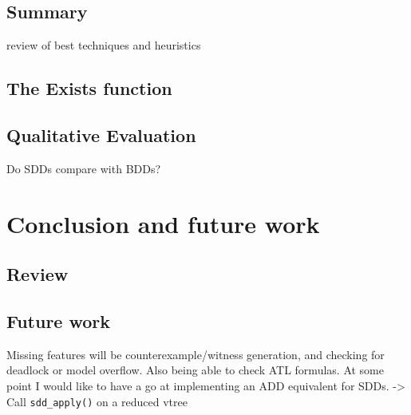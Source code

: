 \documentclass[11pt]{article}
\begin{document}
\subsection{Summary}

review of best techniques and heuristics

\subsection{The Exists function}

\subsection{Qualitative Evaluation}

Do SDDs compare with BDDs?

\section{Conclusion and future work}

\subsection{Review}

\subsection{Future work}

Missing features will be counterexample/witness generation, and checking for deadlock or model overflow. Also being able to check ATL formulas.
At some point I would like to have a go at implementing an ADD equivalent for SDDs.
-> Call \texttt{sdd\_apply()} on a reduced vtree
\end{document}
